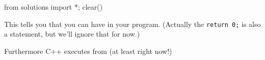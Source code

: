 \begin{python0}
from solutions import *; clear()
\end{python0}


This tells you that you can have  in your program. (Actually the \verb!return 0;! is also a statement, but we'll ignore that for now.)

Furthermore C++ executes from  (at least right now!)







